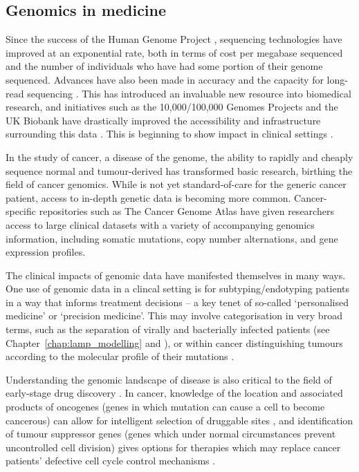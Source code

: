 \documentclass[thesis.tex]{subfiles}
\begin{document}
\subsection{Genomics in medicine}
Since the success of the Human Genome Project \citep{lander_initial_2001}, sequencing technologies
have improved at an exponential rate, both in terms of cost per megabase
sequenced \citep{wetterstrand_dna_2022} and the number of individuals who have had some portion of
their genome sequenced. Advances have also been made in accuracy and the capacity for long-read sequencing \citep{goldfeder_human_2017}. This has introduced an invaluable new resource
into biomedical research, and initiatives such as the 10,000/100,000 Genomes Projects \citep{telenti_deep_2016} and the UK Biobank \citep{bycroft_uk_2018} have drastically improved the accessibility and infrastructure surrounding this data \citep{szustakowski_advancing_2021}. This is beginning to show impact in clinical settings \citep{prokop_genome_2018}. 

In the study of cancer, a disease of the
genome, the ability to rapidly and cheaply sequence normal and tumour-derived  has transformed basic research, birthing the field of cancer
genomics. While  is not yet {standard-of-care} for the generic cancer patient,
access to in-depth genetic data is becoming more common. Cancer-specific repositories such as The Cancer Genome Atlas \citep{weinstein_cancer_2013} have given
researchers access to large clinical datasets with a variety of accompanying
genomics information, including somatic mutations, copy number alternations, and gene expression profiles. 

The clinical impacts of genomic data have manifested themselves in many ways. One use of genomic data in a clincal setting is for subtyping/endotyping patients in a way that informs treatment decisions -- a key tenet of so-called `personalised medicine' or `precision medicine'. This may involve categorisation in very broad terms, such as the separation of virally and bacterially infected patients (see Chapter~\ref{chap:lamp_modelling} and \citealp{remmel_diagnostic_2022}), or within cancer distinguishing tumours according to the molecular profile of their mutations \citep{zhao_molecular_2019}.

Understanding the genomic landscape of disease is also critical to the field of early-stage drug discovery \citep{nelson_support_2015, raja_integrating_2017, king_are_2019}. In cancer, knowledge of the location and associated products of oncogenes (genes in which mutation can cause a cell to become cancerous) can allow for intelligent selection of druggable sites \citep{weinstein_cancer_2002, bedard_small_2020}, and identification of tumour suppressor genes (genes which under normal circumstances prevent uncontrolled cell division) gives options for therapies which may replace cancer patients' defective cell cycle control mechanisms \citep{fang_tumor-suppressing_2003, morris_therapeutic_2015}. 
\end{document}
